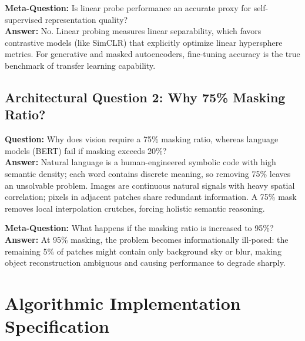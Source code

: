 \documentclass[11pt,a4paper]{article}
\theoremstyle{definition}
\begin{document}
\textbf{Meta-Question:} Is linear probe performance an accurate proxy for self-supervised representation quality?\\
\textbf{Answer:} No. Linear probing measures linear separability, which favors contrastive models (like SimCLR) that explicitly optimize linear hypersphere metrics. For generative and masked autoencoders, fine-tuning accuracy is the true benchmark of transfer learning capability.

\subsection{Architectural Question 2: Why 75\% Masking Ratio?}
\textbf{Question:} Why does vision require a 75\% masking ratio, whereas language models (BERT) fail if masking exceeds 20\%?\\
\textbf{Answer:} Natural language is a human-engineered symbolic code with high semantic density; each word contains discrete meaning, so removing 75\% leaves an unsolvable problem. Images are continuous natural signals with heavy spatial correlation; pixels in adjacent patches share redundant information. A 75\% mask removes local interpolation crutches, forcing holistic semantic reasoning.

\textbf{Meta-Question:} What happens if the masking ratio is increased to 95\%?\\
\textbf{Answer:} At 95\% masking, the problem becomes informationally ill-posed: the remaining 5\% of patches might contain only background sky or blur, making object reconstruction ambiguous and causing performance to degrade sharply.

\section{Algorithmic Implementation Specification}
\end{document}
